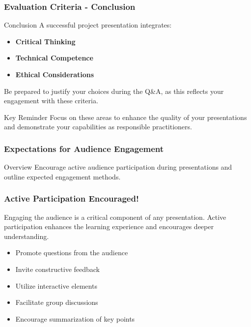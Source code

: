 \documentclass[aspectratio=169]{beamer}
\begin{document}
\begin{frame}[fragile]
    \frametitle{Evaluation Criteria - Conclusion}
    \begin{block}{Conclusion}
        A successful project presentation integrates:
        \begin{itemize}
            \item \textbf{Critical Thinking}
            \item \textbf{Technical Competence}
            \item \textbf{Ethical Considerations}
        \end{itemize}
        Be prepared to justify your choices during the Q\&A, as this reflects your engagement with these criteria.
    \end{block}
    
    \begin{block}{Key Reminder}
        Focus on these areas to enhance the quality of your presentations and demonstrate your capabilities as responsible practitioners.
    \end{block}
\end{frame}

\begin{frame}[fragile]
    \frametitle{Expectations for Audience Engagement}
    \begin{block}{Overview}
        Encourage active audience participation during presentations and outline expected engagement methods.
    \end{block}
\end{frame}

\begin{frame}[fragile]
    \frametitle{Active Participation Encouraged!}
    Engaging the audience is a critical component of any presentation. Active participation enhances the learning experience and encourages deeper understanding. 

    \begin{itemize}
        \item Promote questions from the audience
        \item Invite constructive feedback
        \item Utilize interactive elements
        \item Facilitate group discussions
        \item Encourage summarization of key points
    \end{itemize}
\end{frame}
\end{document}
